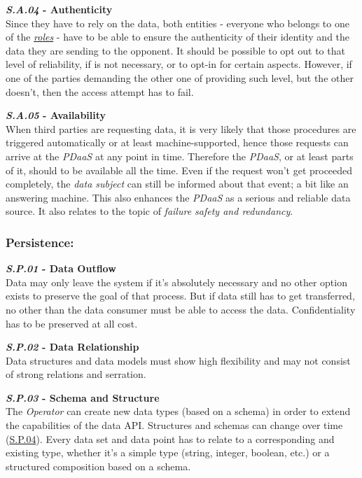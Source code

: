 \documentclass[12pt,english,a4paper,titlepage,cleardoublepage=empty,dottedtoc]{report}
\begin{document}
\textbf{\emph{\protect\hypertarget{sa04}{}{S.A.04}} - Authenticity}\\
Since they have to rely on the data, both entities - everyone who
belongs to one of the \emph{\protect\hyperlink{sa03}{roles}} - have to
be able to ensure the authenticity of their identity and the data they
are sending to the opponent. It should be possible to opt out to that
level of reliability, if is not necessary, or to opt-in for certain
aspects. However, if one of the parties demanding the other one of
providing such level, but the other doesn't, then the access attempt has
to fail.

\textbf{\emph{\protect\hypertarget{sa05}{}{S.A.05}} - Availability}\\
When third parties are requesting data, it is very likely that those
procedures are triggered automatically or at least machine-supported,
hence those requests can arrive at the \emph{PDaaS} at any point in
time. Therefore the \emph{PDaaS}, or at least parts of it, should to be
available all the time. Even if the request won't get proceeded
completely, the \emph{data subject} can still be informed about that
event; a bit like an answering machine. This also enhances the
\emph{PDaaS} as a serious and reliable data source. It also relates to
the topic of \emph{failure safety and redundancy}.

\subsubsection{Persistence:}\label{persistence}

\textbf{\emph{\protect\hypertarget{sp01}{}{S.P.01}} - Data Outflow}\\
Data may only leave the system if it's absolutely necessary and no other
option exists to preserve the goal of that process. But if data still
has to get transferred, no other than the data consumer must be able to
access the data. Confidentiality has to be preserved at all cost.

\textbf{\emph{\protect\hypertarget{sp02}{}{S.P.02}} - Data
Relationship}\\
Data structures and data models must show high flexibility and may not
consist of strong relations and serration.

\textbf{\emph{\protect\hypertarget{sp03}{}{S.P.03}} - Schema and
Structure}\\
The \emph{Operator} can create new data types (based on a schema) in
order to extend the capabilities of the data API. Structures and schemas
can change over time (\protect\hyperlink{sp04}{S.P.04}). Every data set
and data point has to relate to a corresponding and existing type,
whether it's a simple type (string, integer, boolean, etc.) or a
structured composition based on a schema.
\end{document}
